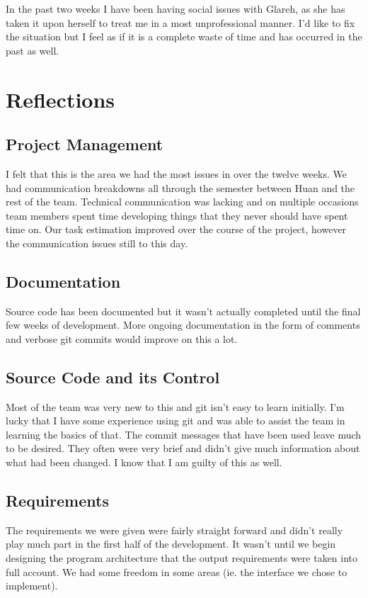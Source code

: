 \documentclass{article}
\begin{document}
In the past two weeks I have been having social issues with Glareh, as she has taken it upon herself to treat me in a most unprofessional manner. I'd like to fix the situation but I feel as if it is a complete waste of time and has occurred in the past as well.

\section{Reflections}
\subsection{Project Management}
I felt that this is the area we had the most issues in over the twelve weeks. We had communication breakdowns all through the semester between Huan and the rest of the team. Technical communication was lacking and on multiple occasions team members spent time developing things that they never should have spent time on. Our task estimation improved over the course of the project, however the communication issues still to this day.

\subsection{Documentation}
Source code has been documented but it wasn't actually completed until the final few weeks of development. More ongoing documentation in the form of comments and verbose git commits would improve on this a lot.

\subsection{Source Code and its Control}
Most of the team was very new to this and git isn't easy to learn initially. I'm lucky that I have some experience using git and was able to assist the team in learning the basics of that. The commit messages that have been used leave much to be desired. They often were very brief and didn't give much information about what had been changed. I know that I am guilty of this as well.

\subsection{Requirements}
The requirements we were given were fairly straight forward and didn't really play much part in the first half of the development. It wasn't until we begin designing the program architecture that the output requirements were taken into full account. We had some freedom in some areas (ie. the interface we chose to implement).
\end{document}
